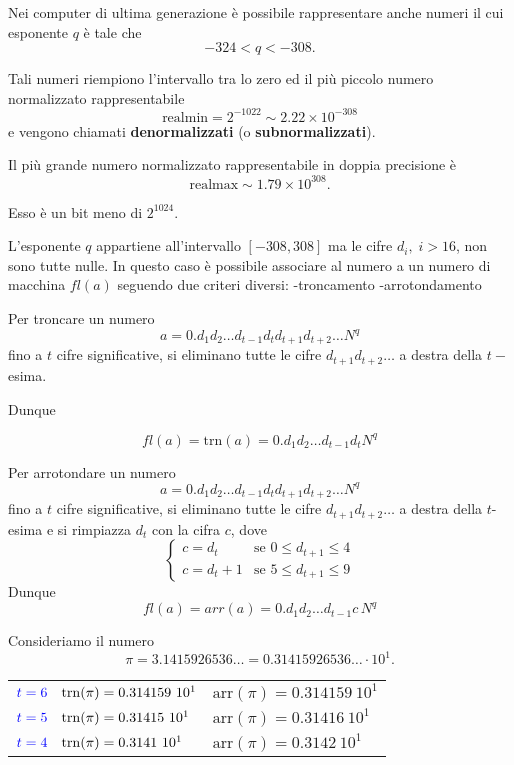 \documentclass[a4paper,12pt]{article}
\theoremstyle{plain}
\theoremstyle{definition}
\theoremstyle{remark}
\begin{document}
Nei computer di ultima generazione è possibile rappresentare anche numeri il cui esponente $q$ è tale che
\[
-324 < q < -308.
\]

Tali numeri riempiono l'intervallo tra lo zero ed il più piccolo numero normalizzato rappresentabile
\[
\text{realmin} = 2^{-1022} \sim 2.22 \times 10^{-308}
\]
e vengono chiamati \textbf{denormalizzati} (o \textbf{subnormalizzati}).



Il più grande numero normalizzato rappresentabile in doppia precisione è
\[
\text{realmax} \sim 1.79 \times 10^{308}.
\]

Esso è un bit meno di $2^{1024}$.

L'esponente $q$ appartiene all'intervallo $[-308, 308]$ ma le cifre
$d_i,\; i > 16$, non sono tutte nulle.
In questo caso è possibile associare al numero a un numero di
macchina $fl(a)$ seguendo due criteri diversi:
-troncamento
-arrotondamento

Per troncare un numero
$$ a = 0.d_1d_2 \dots d_{t-1}d_t d_{t+1}d_{t+2} \dots N^q $$
fino a $t$ cifre significative, si eliminano tutte le cifre $d_{t+1}d_{t+2} \dots$ a destra della $t-$esima.

Dunque

$$ fl(a) = \text{trn}(a) = 0.d_1d_2 \dots d_{t-1}d_t N^q$$

Per arrotondare un numero
$$ a = 0.d_1 d_2 \dots d_{t-1} d_t d_{t+1} d_{t+2} \dots N^q $$
fino a $t$ cifre significative, si eliminano tutte le cifre $d_{t+1}d_{t+2} \dots$ a destra della $t$-esima e si rimpiazza $d_t$ con la cifra $c$, dove
$$
\begin{cases}
c = d_t & \text{se } 0 \le d_{t+1} \le 4 \\
c = d_t + 1 & \text{se } 5 \le d_{t+1} \le 9
\end{cases}
$$
Dunque
$$ fl(a) = arr(a) = 0.d_1 d_2 \dots d_{t-1} c \, N^q $$

 Consideriamo il numero
$$ \pi = 3.1415926536\dots = 0.31415926536\dots \cdot 10^1. $$

\begin{tabular}{ll}
${\color{blue}t=6} \quad \mathrm{trn}(\pi) = 0.314159 \ 10^1$ & $\mathrm{arr}(\pi) = 0.314159 \ 10^1$ \\
${\color{blue}t=5} \quad \mathrm{trn}(\pi) = 0.31415 \ 10^1$ & $\mathrm{arr}(\pi) = 0.31416 \ 10^1$ \\
${\color{blue}t=4} \quad \mathrm{trn}(\pi) = 0.3141 \ 10^1$ & $\mathrm{arr}(\pi) = 0.3142 \ 10^1$ \\
\end{tabular}
\end{document}
